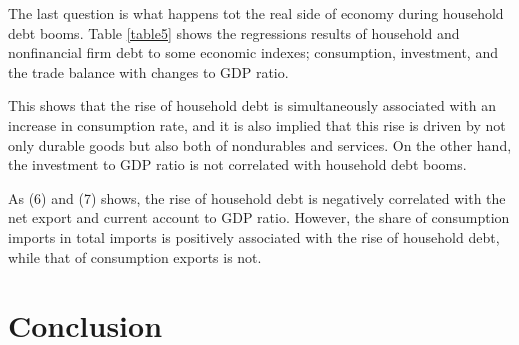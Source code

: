 \documentclass{ltjarticle}
\begin{document}
The last question is what happens tot the real side of economy during household debt booms. Table \ref{table5} shows the regressions results of household and nonfinancial firm debt to some economic indexes; consumption, investment, and the trade balance with changes to GDP ratio. 

This shows that the rise of household debt is simultaneously associated with an increase in consumption rate, and it is also implied that this rise is driven by not only durable goods but also both of nondurables and services. On the other hand, the investment to GDP ratio is not correlated with household debt booms.

As (6) and (7) shows, the rise of household debt is negatively correlated with the net export and current account to GDP ratio. However, the share of consumption imports in total imports is positively associated with the rise of  household debt, while that of consumption exports is not.

\section{Conclusion}
\end{document}
